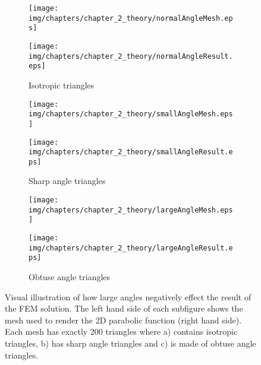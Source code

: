 \begin{figure}[htb!]
\centering
	\begin{subfigure}[b]{\textwidth}
		\centering
		\begin{minipage}[t]{0.48\textwidth}
		\texttt{[image: img/chapters/chapter\_2\_theory/normalAngleMesh.eps]}
		\end{minipage}
		\begin{minipage}[t]{0.48\textwidth}
		\texttt{[image: img/chapters/chapter\_2\_theory/normalAngleResult.eps]}
		\end{minipage}
		\caption{Isotropic triangles}
        \label{fig:normal}
	\end{subfigure}
	\begin{subfigure}[b]{\textwidth}
		\centering
		\begin{minipage}[t]{0.48\textwidth}
		\texttt{[image: img/chapters/chapter\_2\_theory/smallAngleMesh.eps]}
		\end{minipage}
		\begin{minipage}[t]{0.48\textwidth}
		\texttt{[image: img/chapters/chapter\_2\_theory/smallAngleResult.eps]}
		\end{minipage}
		\caption{Sharp angle triangles}
        \label{fig:small}
	\end{subfigure}
	\begin{subfigure}[b]{\textwidth}
		\centering
		\begin{minipage}[t]{0.48\textwidth}
		\texttt{[image: img/chapters/chapter\_2\_theory/largeAngleMesh.eps]}
		\end{minipage}
		\begin{minipage}[t]{0.48\textwidth}
		\texttt{[image: img/chapters/chapter\_2\_theory/largeAngleResult.eps]}
		\end{minipage}
		\caption{Obtuse angle triangles}
        \label{fig:large}
	\end{subfigure}
	\caption[Illustration how large angles in element negatively effect FEM results]{Visual illustration of how large angles negatively effect the result of the FEM solution. The left hand side of each subfigure shows the mesh used to render the 2D parabolic function (right hand side). Each mesh has exactly 200 triangles where a) contains isotropic triangles, b) has sharp angle triangles and c) is made of obtuse angle triangles.}
    \label{fig:meshShape}
\end{figure}
%
